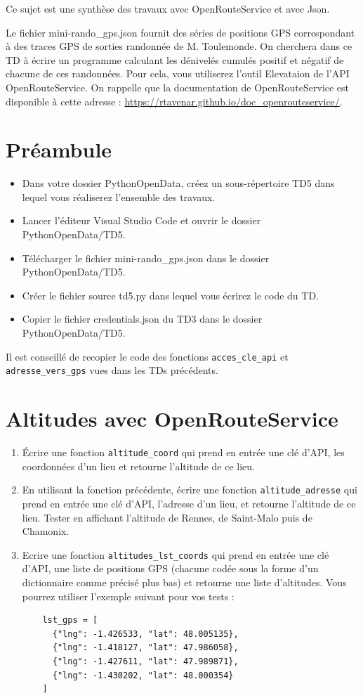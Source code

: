 \documentclass[11pt,a4paper]{article}
\begin{document}
Ce sujet est une synthèse des travaux avec OpenRouteService et avec Json. 

Le fichier mini-rando\_gps.json fournit des séries de positions GPS correspondant à des traces GPS de sorties randonnée de M. Toulemonde. On cherchera dans ce TD à écrire un programme calculant les dénivelés cumulés positif et négatif de chacune de ces randonnées. Pour cela, vous utiliserez l'outil Elevataion de l’API OpenRouteService.
On rappelle que la documentation de OpenRouteService est disponible à cette adresse : \url{https://rtavenar.github.io/doc_openrouteservice/}.
\section*{Préambule}
\begin{itemize}
    \item Dans votre dossier PythonOpenData, créez un sous-répertoire TD5 dans lequel vous réaliserez l'ensemble des travaux.
    \item Lancer l'éditeur Visual Studio Code et ouvrir le dossier PythonOpenData/TD5. 
    \item Télécharger le fichier mini-rando\_gps.json dans le dossier PythonOpenData/TD5.
  \item Créer le fichier source td5.py dans lequel vous écrirez le code du TD.
    \item Copier le fichier credentials.json du TD3 dans le dossier PythonOpenData/TD5.
  
\end{itemize}

Il est conseillé de recopier le code des fonctions \verb+acces_cle_api+ et \verb+adresse_vers_gps+ vues dans les TDs précédents.

\section{Altitudes avec OpenRouteService}
\begin{enumerate}
    \item Écrire une fonction \verb+altitude_coord+ qui prend en entrée une clé d'API, les coordonnées d'un lieu et retourne l'altitude de ce lieu.
    \item En utilisant la fonction précédente, écrire une fonction \verb+altitude_adresse+ qui prend en entrée une clé d'API, l'adresse d'un lieu, et retourne l'altitude de ce lieu.  Tester en affichant l'altitude de Rennes, de Saint-Malo puis de Chamonix.
    \item Ecrire une fonction \verb+altitudes_lst_coords+ qui prend en entrée une clé d'API, une liste de positions GPS (chacune codée sous la forme d’un dictionnaire comme précisé plus bas) et retourne une liste d’altitudes. Vous pourrez utiliser l’exemple suivant pour vos tests :
\begin{verbatim}
    lst_gps = [
      {"lng": -1.426533, "lat": 48.005135},
      {"lng": -1.418127, "lat": 47.986058},
      {"lng": -1.427611, "lat": 47.989871},
      {"lng": -1.430202, "lat": 48.000354}
    ]
\end{verbatim}
\end{enumerate}
\end{document}
